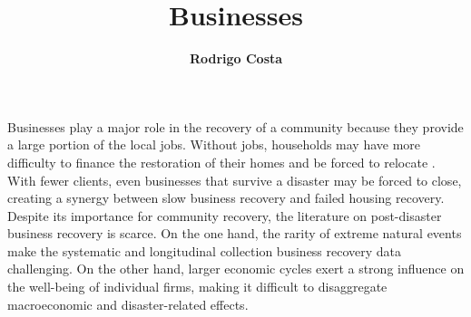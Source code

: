 %
%
%


%
%
%
%
%
%
%
%

\title{Businesses}
\author{
    \textbf{Rodrigo Costa}}
\tocauthor{}
%
%
\maketitle
Businesses play a major role in the recovery of a community because they provide a large portion of the local jobs. Without jobs, households may have more difficulty to finance the restoration of their homes and be forced to relocate \citep{bolin1983recovery,wang2015influencing}. With fewer clients, even businesses that survive a disaster may be forced to close, creating a synergy between slow business recovery and failed housing recovery. Despite its importance for community recovery, the literature on post-disaster business recovery is scarce. On the one hand, the rarity of extreme natural events make the systematic and longitudinal collection business recovery data challenging. On the other hand, larger economic cycles exert a strong influence on the well-being of individual firms, making it difficult to disaggregate macroeconomic and disaster-related effects.

